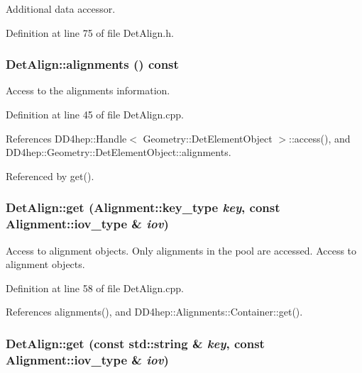 Additional data accessor. 

Definition at line 75 of file DetAlign.h.\hypertarget{class_d_d4hep_1_1_alignments_1_1_det_align_ad2d4b23bcf8c7bd32ac279c35538c29f}{
\subsubsection[{alignments}]{ DetAlign::alignments () const}}
\label{class_d_d4hep_1_1_alignments_1_1_det_align_ad2d4b23bcf8c7bd32ac279c35538c29f}


Access to the alignments information. 

Definition at line 45 of file DetAlign.cpp.

References DD4hep::Handle$<$ Geometry::DetElementObject $>$::access(), and DD4hep::Geometry::DetElementObject::alignments.

Referenced by get().\hypertarget{class_d_d4hep_1_1_alignments_1_1_det_align_af0a58378d82a0076222f0b9b7327f524}{
\subsubsection[{get}]{ DetAlign::get ({\bf Alignment::key\_\-type} {\em key}, \/  const {\bf Alignment::iov\_\-type} \& {\em iov})}}
\label{class_d_d4hep_1_1_alignments_1_1_det_align_af0a58378d82a0076222f0b9b7327f524}


Access to alignment objects. Only alignments in the pool are accessed. Access to alignment objects. 

Definition at line 58 of file DetAlign.cpp.

References alignments(), and DD4hep::Alignments::Container::get().\hypertarget{class_d_d4hep_1_1_alignments_1_1_det_align_aa009f405b4f76dadc3d6e8efae1f338d}{
\subsubsection[{get}]{ DetAlign::get (const std::string \& {\em key}, \/  const {\bf Alignment::iov\_\-type} \& {\em iov})}}
\label{class_d_d4hep_1_1_alignments_1_1_det_align_aa009f405b4f76dadc3d6e8efae1f338d}


